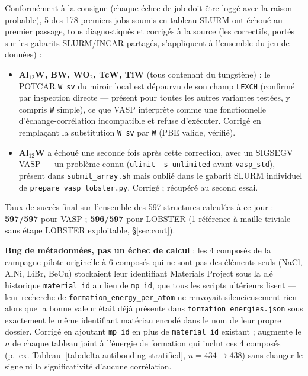 \documentclass[11pt,a4paper]{article}
\begin{document}
Conformément à la consigne (\og{}chaque échec de job doit être loggé avec la
raison probable\fg{}), 5 des 178 premiers jobs soumis en tableau SLURM ont
échoué au premier passage, tous diagnostiqués et corrigés à la source
(les correctifs, portés sur les gabarits SLURM/INCAR partagés,
s'appliquent à l'ensemble du jeu de données) :

\begin{itemize}
  \item \textbf{Al$_{12}$W, BW, WO$_2$, TcW, TiW} (tous contenant du
    tungstène) :
    le POTCAR \texttt{W\_sv} du miroir local est dépourvu de son champ
    \texttt{LEXCH} (confirmé par inspection directe --- présent pour toutes
    les autres variantes testées, y compris \texttt{W} simple), ce que VASP
    interprète comme une fonctionnelle d'échange-corrélation incompatible
    et refuse d'exécuter. Corrigé en remplaçant la substitution
    \texttt{W\_sv} par \texttt{W} (PBE valide, vérifié).
  \item \textbf{Al$_{12}$W} a échoué une seconde fois après cette correction,
    avec un SIGSEGV VASP --- un problème connu
    (\texttt{ulimit -s unlimited} avant \texttt{vasp\_std}), présent
    dans \texttt{submit\_array.sh} mais oublié dans le gabarit SLURM
    individuel de \texttt{prepare\_vasp\_lobster.py}. Corrigé ; récupéré au
    second essai.
\end{itemize}

Taux de succès final sur l'ensemble des 597 structures calculées à ce
jour : \textbf{597/597} pour VASP ; \textbf{596/597} pour LOBSTER (1
référence à maille triviale sans étape LOBSTER exploitable, \S\ref{sec:cout}).

\textbf{Bug de métadonnées, pas un échec de calcul} : les 4 composés de
la campagne pilote originelle à 6 composés qui ne sont pas des éléments
seuls (NaCl, AlNi, LiBr, BeCu) stockaient leur identifiant Materials
Project sous la clé historique \texttt{material\_id} au lieu de
\texttt{mp\_id}, que tous les scripts ultérieurs lisent --- leur
recherche de \texttt{formation\_energy\_per\_atom} ne renvoyait
silencieusement rien alors que la bonne valeur était déjà présente dans
\texttt{formation\_energies.json} sous exactement le même identifiant
matériau encodé dans le nom de leur propre dossier. Corrigé en ajoutant
\texttt{mp\_id} en plus de \texttt{material\_id} existant ; augmente le
$n$ de chaque tableau joint à l'énergie de formation qui inclut ces 4
composés (p.~ex. Tableau~\ref{tab:delta-antibonding-stratified},
$n=434\to438$) sans changer le signe ni la significativité d'aucune
corrélation.
\end{document}
